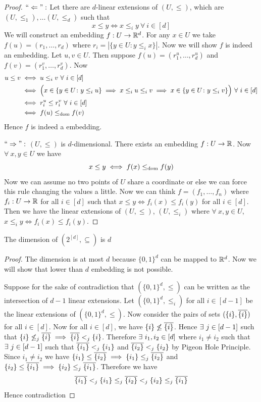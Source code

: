 \begin{proof}
	$``\Leftarrow":$ Let there are $d$-linear extensions of $(U,\leq)$, which are $(U,\leq_1),\dots(U,\leq_d)$ such that $$x\leq y\iff x\leq_i y\ \forall\ i\in[d]$$We will construct an embedding $f:U\to \mathbb{R}^d$. For any $x\in U$ we take $f(u)=(r_1,\dots, r_d)$ where $r_i=|\{y\in U\colon y\leq_i x\}|$. Now we will show $f$ is indeed an embedding. Let $u,v\in U$. Then  suppose $f(u)=(r_1^u,\dots,r_d^u)$ and $f(v)=(r_1^v,\dots, r_d^v)$. Now 
	\begin{align*}
		u\leq v&\iff u\leq_i v\ \forall \ i\in[d]\\
		 & \iff \Big(x\in\{y\in U\colon y\leq_i u\}\implies x\leq_i u\leq_i v\implies x\in   \{y\in U\colon y\leq_i v\}  \Big)\ \forall \ i\in[d]\\
		 & \iff r_i^u\leq r_i^v\ \forall \ i\in[d]\\
		 & \iff f(u)\domrel f(v)
	\end{align*}Hence $f$ is indeed a embedding. 

$``\Rightarrow":$ $(U,\leq)$ is $d$-dimensional. There exists an embedding $f:U\to\mathbb{R}$. Now $\forall\ x,y\in U$ we have $$x\leq y\iff f(x)\leq_{\text{dom}} f(y)$$Now we can assume no two points of $U$ share a coordinate or else we can force this rule changing the values a little. Now we can think $f=(f_1,\dots, f_n)$ where $f_i:U\to \mathbb{R}$ for all $i\in[d]$ such that $x\leq y\iff f_i(x)\leq f_i(y)$ for all $i\in[d]$. Then we have the linear extensions of $(U,\leq)$, $(U,\leq_i)$ where $\forall\ x,y\in U$, $x\leq_i y\iff f_i(x)\leq f_i(y)$.  
\end{proof}
\begin{lemma}{}{}
	The dimension of $(2^{[d]},\subseteq)$ is $d$
\end{lemma}
\begin{proof}
	The dimension is at most $d$ because $\{0,1\}^d$ can be mapped to $\mathbb{R}^d$. Now we will show that  lower than $d$ embedding is not possible. 
	
	Suppose for the sake of contradiction that $(\{0,1\}^d,\leq )$ can be written as the intersection of $d-1$ linear extensions. Let $(\{0,1\}^d,\leq_i)$ for all $i\in[d-1]$ be the linear extensions of $(\{0,1\}^d,\leq)$. Now consider the pairs of sets $(\{i\},\overline{\{i\}})$ for all $i\in[d]$. Now for all $i\in[d]$, we have $\{i\}\not\leq \overline{\{i\}}$. Hence $\exists\ j\in[d-1]$ such that $\{i\}\not\leq_j\overline{\{i\}}\implies \overline{\{i\}}<_j\{i\}$. 	Therefore $\exists\ i_1,i_2\in[d]$ where $i_1\neq i_2$ such that $\exists\ j\in[d-1]$ such that $\overline{\{i_1\}}<_j\{i_1\}$ and $\overline{\{i_2\}}<_j\{i_2\}$ by Pigeon Hole Principle. Since $i_1\neq i_2$ we have $\{i_1\}\leq \overline{\{i_2\}}\implies \{i_1\}\leq_j\overline{\{i_2\}}$ and $\{i_2\}\leq \overline{\{i_1\}}\implies \{i_2\}\leq_j\overline{\{i_1\}}$. Therefore we have $$\overline{\{i_1\}}<_j\{i_1\}\leq_j \overline{\{i_2\}}<_j\{i_2\}\leq_j\overline{\{i_1\}}$$Hence contradiction \ctr
\end{proof}

